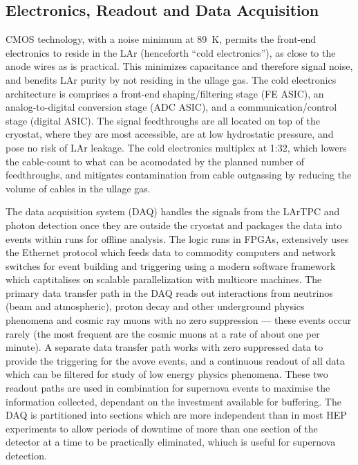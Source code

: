 \subsection{Electronics, Readout and Data Acquisition}
\label{sec:det_electronics}


CMOS technology, with a noise minimum at 89~K, permits the front-end electronics to reside in the LAr (henceforth ``cold electronics''), as close to the anode wires as is practical. This minimizes capacitance and therefore signal noise, and benefits LAr purity by not residing in the ullage gas. The cold electronics architecture is comprises a front-end shaping/filtering stage (FE ASIC), an analog-to-digital conversion stage (ADC ASIC), and a communication/control stage (digital ASIC). The signal feedthroughs are all located on top of the cryostat, where they are most accessible, are at low hydrostatic pressure, and pose no risk of LAr leakage. The cold electronics multiplex at 1:32, which lowers the cable-count to what can be acomodated by the planned number of feedthroughs, and mitigates contamination from cable outgassing by reducing the volume of cables in the ullage gas.

The data acquisition system (DAQ) handles the signals from the LArTPC and photon detection once they are outside the cryostat and packages the data into events within runs for offline analysis.  The logic runs in FPGAs, extensively uses the Ethernet protocol which feeds data to commodity computers and network switches  for event building and triggering using a modern software framework which captitalises on scalable parallelization with multicore machines. The primary data transfer path in the DAQ reads out interactions from neutrinos (beam and atmospheric), proton decay and other underground physics phenomena and cosmic ray muons with no zero suppression --- these events occur rarely (the most frequent are the cosmic muons at a rate of about one per minute).  A separate data transfer path works with zero suppressed data to provide the triggering for the avove events, and a continuous readout of all data which can be filtered for study of low energy physics phenomena.  These two readout paths are used in combination for supernova events to maximise the information collected, dependant on the investment available for buffering.  The DAQ is partitioned into sections which are more independent than in most HEP experiments to allow periods of downtime of more than one section of the detector at a time to be practically eliminated, whiuch is useful for supernova detection.

